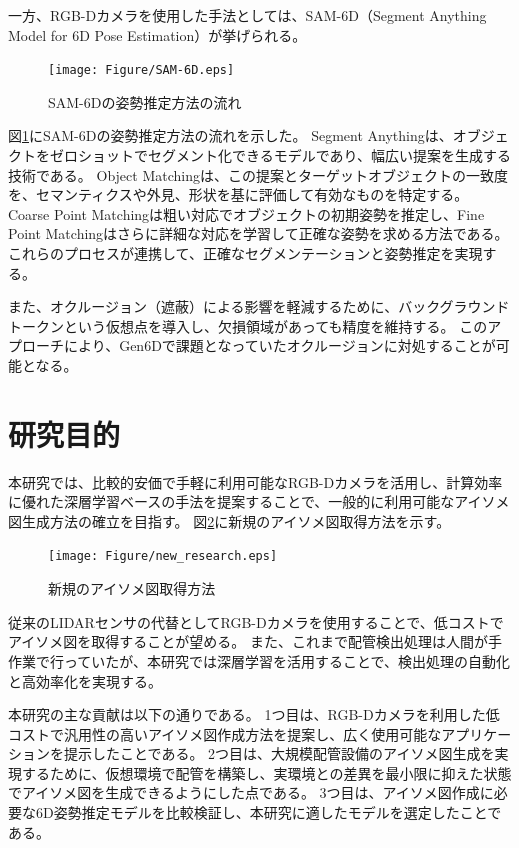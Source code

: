 一方、RGB-Dカメラを使用した手法としては、SAM-6D（Segment Anything Model for 6D Pose Estimation）が挙げられる。
\begin{figure}[htbt]
	\centering
	 \texttt{[image: Figure/SAM-6D.eps]}
	 \caption{SAM-6Dの姿勢推定方法の流れ}
	 \label{fig:f7}
\end{figure}

図\ref{fig:f7}にSAM-6Dの姿勢推定方法の流れを示した。
Segment Anythingは、オブジェクトをゼロショットでセグメント化できるモデルであり、幅広い提案を生成する技術である。
Object Matchingは、この提案とターゲットオブジェクトの一致度を、セマンティクスや外見、形状を基に評価して有効なものを特定する。
Coarse Point Matchingは粗い対応でオブジェクトの初期姿勢を推定し、Fine Point Matchingはさらに詳細な対応を学習して正確な姿勢を求める方法である。
これらのプロセスが連携して、正確なセグメンテーションと姿勢推定を実現する。

また、オクルージョン（遮蔽）による影響を軽減するために、バックグラウンドトークンという仮想点を導入し、欠損領域があっても精度を維持する。
このアプローチにより、Gen6Dで課題となっていたオクルージョンに対処することが可能となる。


\section{研究目的}
本研究では、比較的安価で手軽に利用可能なRGB-Dカメラを活用し、計算効率に優れた深層学習ベースの手法を提案することで、一般的に利用可能なアイソメ図生成方法の確立を目指す。
図\ref{fig:f8}に新規のアイソメ図取得方法を示す。\\
\begin{figure}[htbt]
	\centering
	 \texttt{[image: Figure/new\_research.eps]}
	 \caption{新規のアイソメ図取得方法}
	 \label{fig:f8}
\end{figure}

従来のLIDARセンサの代替としてRGB-Dカメラを使用することで、低コストでアイソメ図を取得することが望める。
また、これまで配管検出処理は人間が手作業で行っていたが、本研究では深層学習を活用することで、検出処理の自動化と高効率化を実現する。

本研究の主な貢献は以下の通りである。
1つ目は、RGB-Dカメラを利用した低コストで汎用性の高いアイソメ図作成方法を提案し、広く使用可能なアプリケーションを提示したことである。
2つ目は、大規模配管設備のアイソメ図生成を実現するために、仮想環境で配管を構築し、実環境との差異を最小限に抑えた状態でアイソメ図を生成できるようにした点である。
3つ目は、アイソメ図作成に必要な6D姿勢推定モデルを比較検証し、本研究に適したモデルを選定したことである。


